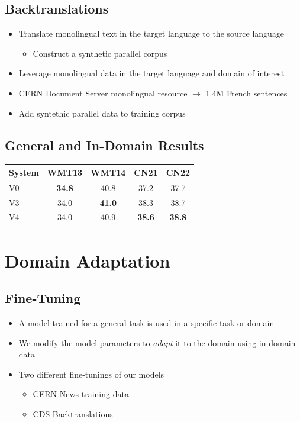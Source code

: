 \documentclass[landscape]{article}
\begin{document}
\subsection*{Backtranslations}
\vspace*{5mm}
\begin{itemize}\itemsep=5mm
	\item Translate monolingual text in the target language to the source language
		\begin{itemize}
			\item Construct a synthetic parallel corpus
		\end{itemize}
	\item Leverage monolingual data in the target language and domain of interest
    \item CERN Document Server monolingual resource $\to$ 1.4M French sentences  
    \item Add syntethic parallel data to training corpus
\end{itemize}

\subsection*{General and In-Domain Results}
\begin{table}[ht]
\centering
\begin{tabular}{l|c|c|c|c}\label{transformer:wmt:r}
System & WMT13 & WMT14 & CN21 & CN22 \\
\hline
V0 & \textbf{34.8} & 40.8 & 37.2 & 37.7\\
V3 & 34.0 & \textbf{41.0} & 38.3 & 38.7\\
V4 & 34.0 & 40.9 & \textbf{38.6} & \textbf{38.8}\\
\end{tabular}
\label{table:bleuoffv4}
\end{table}


\cp
\section*{Domain Adaptation}
\vspace*{10mm}
\subsection*{Fine-Tuning}
\vspace*{5mm}
\begin{itemize}\itemsep=7mm
	\item A model trained for a general task is used in a specific task or domain
	\item We modify the model parameters to \textit{adapt} it to the domain using in-domain data
    \item Two different fine-tunings of our models
        \begin{itemize}
            \item CERN News training data 
            \item CDS Backtranslations
        \end{itemize}
\end{itemize}
\end{document}

